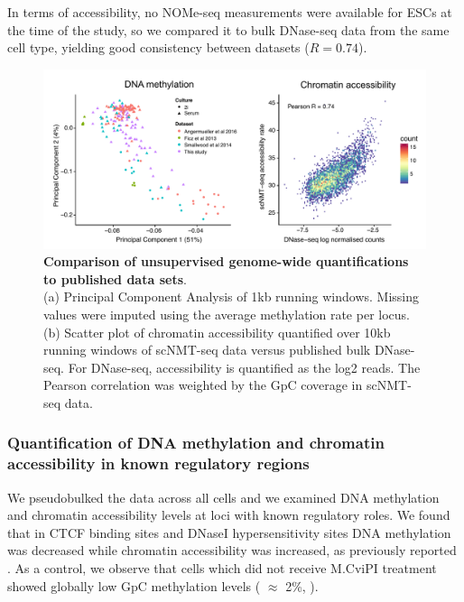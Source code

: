 In terms of accessibility, no NOMe-seq measurements were available for ESCs at the time of the study, so we compared it to bulk DNase-seq data from the same cell type, yielding good consistency between datasets ($R=0.74$).
\begin{figure}[H]
	\centering
	\includegraphics[width=1.0\linewidth]{scNMT_comparison}
	\caption[]{\textbf{Comparison of unsupervised genome-wide quantifications to published data sets}.\\
	(a) Principal Component Analysis of 1kb running windows. Missing values were imputed using the average methylation rate per locus.\\
	(b) Scatter plot of chromatin accessibility quantified over 10kb running windows of scNMT-seq data versus published bulk DNase-seq. For DNase-seq, accessibility is quantified as the log2 reads. The Pearson correlation was weighted by the GpC coverage in scNMT-seq data. }
	\label{fig:scnmt_comparison}
\end{figure}


\subsubsection{Quantification of DNA methylation and chromatin accessibility in known regulatory regions}

We pseudobulked the data across all cells and we examined DNA methylation and chromatin accessibility levels at loci with known regulatory roles. We found that in CTCF binding sites and DNaseI hypersensitivity sites DNA methylation was decreased while chromatin accessibility was increased, as previously reported \cite{Pott2016}. As a control, we observe that cells which did not receive M.CviPI treatment showed globally low GpC methylation levels ( $\approx$ 2\%, ).


